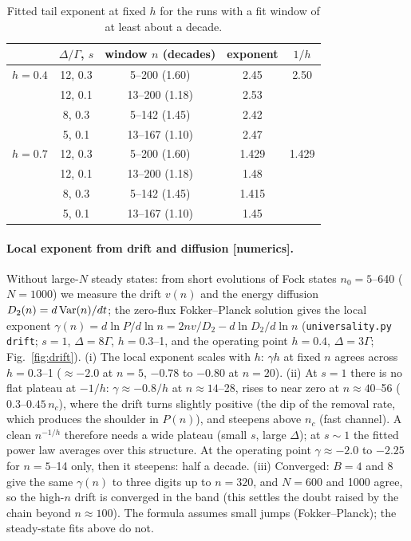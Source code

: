 \documentclass[11pt,a4paper]{article}
\begin{document}
\begin{table}[h]
\centering\small
\begin{tabular}{lcccc}
\toprule
 & $\Delta/\Gamma$, $s$ & window $n$ (decades) & exponent & $1/h$\\
\midrule
$h=0.4$ & 12, 0.3 & 5--200 (1.60) & 2.45 & 2.50\\
 & 12, 0.1 & 13--200 (1.18) & 2.53 & \\
 & 8, 0.3 & 5--142 (1.45) & 2.42 & \\
 & 5, 0.1 & 13--167 (1.10) & 2.47 & \\
$h=0.7$ & 12, 0.3 & 5--200 (1.60) & 1.429 & 1.429\\
 & 12, 0.1 & 13--200 (1.18) & 1.48 & \\
 & 8, 0.3 & 5--142 (1.45) & 1.415 & \\
 & 5, 0.1 & 13--167 (1.10) & 1.45 & \\
\bottomrule
\end{tabular}
\caption{Fitted tail exponent at fixed $h$ for the runs with a fit window of at least about a decade.}
\label{tab:fixedh}
\end{table}

\paragraph{Local exponent from drift and diffusion [numerics].} Without large-$N$ steady states: from short evolutions of Fock states $n_0=5$--640 ($N=1000$) we measure the drift $v(n)$ and the energy diffusion $D_2(n)=d\,{\rm Var}(n)/dt$; the zero-flux Fokker--Planck solution gives the local exponent $\gamma(n)=d\ln P/d\ln n=2nv/D_2-d\ln D_2/d\ln n$ (\texttt{universality.py drift}; $s=1$, $\Delta=8\Gamma$, $h=0.3$--1, and the operating point $h=0.4$, $\Delta=3\Gamma$; Fig.~\ref{fig:drift}). (i) The local exponent scales with $h$: $\gamma h$ at fixed $n$ agrees across $h=0.3$--1 ($\approx-2.0$ at $n=5$, $-0.78$ to $-0.80$ at $n=20$). (ii) At $s=1$ there is no flat plateau at $-1/h$: $\gamma\approx-0.8/h$ at $n\approx14$--28, rises to near zero at $n\approx40$--56 ($0.3$--$0.45\,n_c$), where the drift turns slightly positive (the dip of the removal rate, which produces the shoulder in $P(n)$), and steepens above $n_c$ (fast channel). A clean $n^{-1/h}$ therefore needs a wide plateau (small $s$, large $\Delta$); at $s\sim1$ the fitted power law averages over this structure. At the operating point $\gamma\approx-2.0$ to $-2.25$ for $n=5$--14 only, then it steepens: half a decade. (iii) Converged: $B=4$ and 8 give the same $\gamma(n)$ to three digits up to $n=320$, and $N=600$ and 1000 agree, so the high-$n$ drift is converged in the band (this settles the doubt raised by the chain beyond $n\approx100$). The formula assumes small jumps (Fokker--Planck); the steady-state fits above do not.
\end{document}
